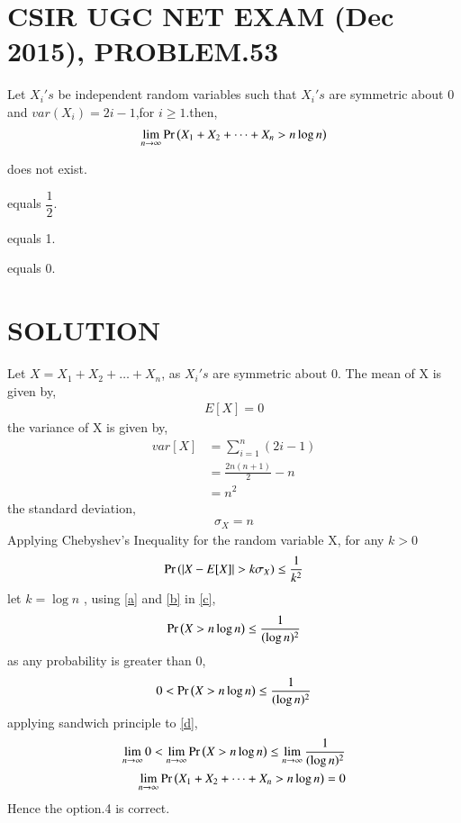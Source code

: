 \documentclass[journal,12pt,twocolumn]{IEEEtran}
\begin{document}
\section{CSIR UGC NET EXAM (Dec 2015), PROBLEM.53}
Let $X_i 's$ be independent random variables such that $X_i 's$ are symmetric about 0 and $var(X_i)=2i - 1$,for $i\geq 1$.then,
$$\lim_{n \to \infty}\Pr\left(X_1 +X_2 + \dots + X_n > n\log{n}\right)$$
\begin{enumerate}
\begin{multicols}{2}
\setlength\itemsep{2em}
\item does not exist.
\item equals $\dfrac{1}{2}$.\\
\item equals 1.
\item equals 0.
\end{multicols}
\end{enumerate}
\section{SOLUTION}
Let $X= X_1 +X_2 + \dots + X_n $,
as $X_i 's$ are symmetric about 0.
The mean of X is given by,
\begin{align}
E[X]=0 \label{a}
\end{align}
the variance of X is given by,
\begin{align}
var[X]&= \sum_{i=1}^{n}(2i -1)\\
   &= \frac{2n(n+1)}{2} - n\\
   &= n^{2}
\end{align}
the standard deviation,
\begin{align}
\sigma_X = n \label{b}
\end{align}
Applying Chebyshev's Inequality for the random variable X, for any $k>0$
\begin{align}
\Pr\left(\vert X-E[X]\vert> k\sigma_X\right) \leq \frac{1}{k^{2}} \label{c}
\end{align}
let $k=\log{n} $ ,
using \eqref{a} and \eqref{b} in \eqref{c},
\begin{align}
\Pr\left(X> n\log{n}\right) \leq \frac{1}{(\log{n})^{2}}
\end{align}
as any probability is greater than 0,
\begin{align}
0< \Pr\left(X> n\log{n}\right) \leq \frac{1}{(\log{n})^{2}} \label{d}
\end{align}
applying sandwich principle to \eqref{d},
\begin{align}
\lim_{n \to \infty} 0< \lim_{n \to \infty} \Pr\left(X> n\log{n}\right) \leq \lim_{n \to \infty} \frac{1}{(\log{n})^{2}}\\
\lim_{n \to \infty}\Pr\left(X_1 +X_2 + \dots + X_n > n\log{n}\right) = 0
\end{align}
Hence the option.4 is correct.
\end{document}
